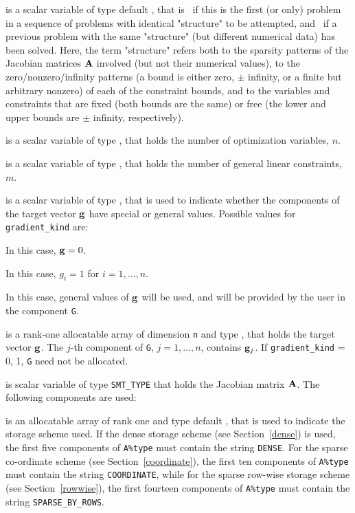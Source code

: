 \documentclass{galahad}
\begin{document}
\begin{description}

 is a scalar variable of type default \logical, 
 that is \true\ if this is the first (or only) problem in a sequence of 
 problems with identical "structure" to be attempted, and \false\ if 
 a previous problem with the same "structure" (but different
 numerical data) has been solved. Here, the term "structure" refers both to 
 the sparsity patterns of the Jacobian matrices ${\mathbf{A}}$ involved 
 (but not their numerical values), to the zero/nonzero/infinity patterns 
 (a bound is either zero, $\pm$ infinity, or a finite but arbitrary 
 nonzero) of each of the constraint bounds, and to the variables and constraints
 that are fixed (both bounds are the same) or free (the lower and upper
 bounds are $\pm$ infinity, respectively).

 is a scalar variable of type \integer, 
 that holds the number of optimization variables, $n$.  
              
 is a scalar variable of type \integer, 
 that holds the number of general linear constraints, $m$.
              
 is a scalar variable of type \integer, 
that is used to indicate whether the components of the target vector ${\mathbf{g}}$ 
have special or general values. Possible values for {\tt gradient\_kind} are:
\begin{description}
  In this case, ${\mathbf{g}} = 0$.

 In this case, $g_{i} = 1$ for $i = 1, \ldots ,n$.

 In this case, general values of ${\mathbf{g}}$ will be used,
     and will be provided by the user in the component {\tt G}.
\end{description}

 is a rank-one allocatable array of dimension {\tt n} and type 
\realdp, that holds the target vector ${\mathbf{g}}$.
The $j$-th component of 
{\tt G}, $j = 1,  \ldots ,  n$, contains ${\mathbf{g}}_{j}$.
If {\tt gradient\_kind} {= 0, 1}, {\tt G} need not be allocated.

 is scalar variable of type {\tt SMT\_TYPE} 
that holds the Jacobian matrix ${\mathbf{A}}$. The following components are used:

\begin{description}

 is an allocatable array of rank one and type default \character, that
is used to indicate the storage scheme used. If the dense storage scheme 
(see Section~\ref{dense}) is used, 
the first five components of {\tt A\%type} must contain the
string {\tt DENSE}.
For the sparse co-ordinate scheme (see Section~\ref{coordinate}), 
the first ten components of {\tt A\%type} must contain the
string {\tt COORDINATE}, while 
for the sparse row-wise storage scheme (see Section~\ref{rowwise}),
the first fourteen components of {\tt A\%type} must contain the
string {\tt SPARSE\_BY\_ROWS}.


\end{description}
\end{description}
\end{document}
